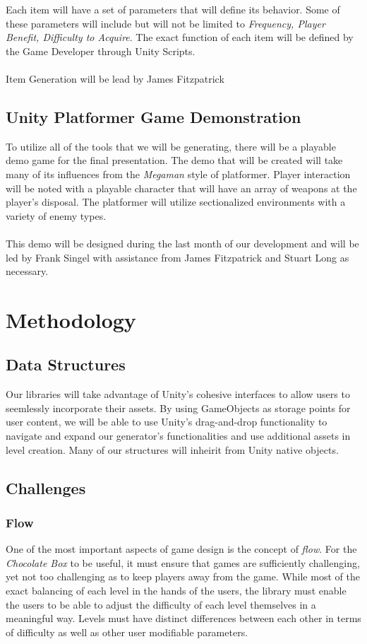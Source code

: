 \documentclass[pdftex,12pt,letter]{article}
\begin{document}
\begin{itemize}
\begin{itemize}
\begin{itemize}
\endgroup

Each item will have a set of parameters that will define its behavior. Some of these parameters will include but will not be limited to \textit{Frequency, Player Benefit, Difficulty to Acquire}. The exact function of each item will be defined by the Game Developer through Unity Scripts. 
\\\\
Item Generation will be lead by James Fitzpatrick

\subsection{Unity Platformer Game Demonstration}
To utilize all of the tools that we will be generating, there will be a playable demo game for the final presentation. The demo that will be created will take many of its influences from the \textit{Megaman} style of platformer.  Player interaction will be noted with a playable character that will have an array of weapons at the player's disposal. The platformer will utilize sectionalized environments with a variety of enemy types. 
\\\\
This demo will be designed during the last month of our development and will be led by Frank Singel with assistance from James Fitzpatrick and Stuart Long as necessary. 

\section{Methodology}
\subsection{Data Structures}
Our libraries will take advantage of Unity's cohesive interfaces to allow users to seemlessly incorporate their assets. By using GameObjects as storage points for user content, we will be able to use Unity's drag-and-drop functionality to navigate and expand our generator's functionalities and use additional assets in level creation. Many of our structures will inheirit from  Unity native objects.

\subsection{Challenges}
\subsubsection{Flow}
One of the most important aspects of game design is the concept of \textit{flow}.  For the \textit{Chocolate Box} to be useful, it must ensure that games are sufficiently challenging, yet not too challenging as to keep players away from the game. While most of the  exact balancing of each level in the hands of the users, the library must enable the users to be able to adjust the difficulty of each level themselves in a meaningful way. Levels must have distinct differences between each other in terms of difficulty as well as other user modifiable parameters. 

\end{itemize}
\end{itemize}
\end{itemize}
\end{document}
